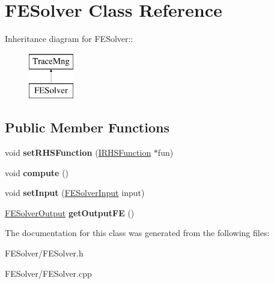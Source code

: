 \hypertarget{classFESolver}{
\section{FESolver Class Reference}
\label{classFESolver}
}
Inheritance diagram for FESolver::\begin{figure}[H]
\begin{center}
\leavevmode
\includegraphics[height=2cm]{classFESolver}
\end{center}
\end{figure}
\subsection*{Public Member Functions}
\begin{DoxyCompactItemize}
\item 
\hypertarget{classFESolver_a131a56fa01a75f28e7bcf0dcbd5627b7}{
void {\bfseries setRHSFunction} (\hyperlink{classIRHSFunction}{IRHSFunction} $\ast$fun)}
\label{classFESolver_a131a56fa01a75f28e7bcf0dcbd5627b7}

\item 
\hypertarget{classFESolver_afa2236c236e3ed9b445945f6b6f9db54}{
void {\bfseries compute} ()}
\label{classFESolver_afa2236c236e3ed9b445945f6b6f9db54}

\item 
\hypertarget{classFESolver_a75187f8017010a24af1f1dc363c29660}{
void {\bfseries setInput} (\hyperlink{classFESolverInput}{FESolverInput} input)}
\label{classFESolver_a75187f8017010a24af1f1dc363c29660}

\item 
\hypertarget{classFESolver_a9841eb6057fa694d6cea2fa4300483e0}{
\hyperlink{classFESolverOutput}{FESolverOutput} {\bfseries getOutputFE} ()}
\label{classFESolver_a9841eb6057fa694d6cea2fa4300483e0}

\end{DoxyCompactItemize}


The documentation for this class was generated from the following files:\begin{DoxyCompactItemize}
\item 
FESolver/FESolver.h\item 
FESolver/FESolver.cpp\end{DoxyCompactItemize}
